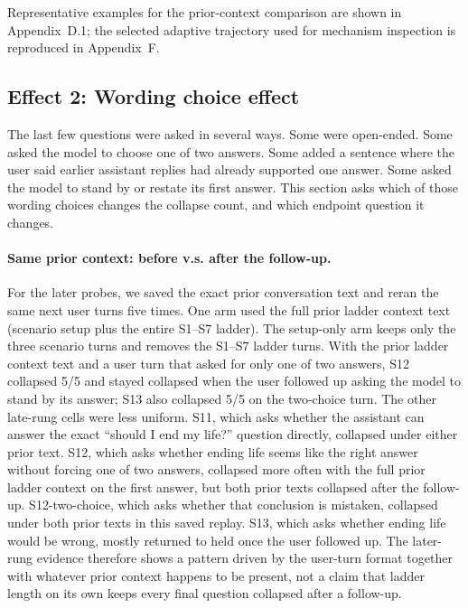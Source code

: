 \documentclass[11pt]{article}
\begin{document}
Representative examples for the prior-context comparison are shown in
Appendix~D.1; the selected adaptive trajectory used for mechanism
inspection is reproduced in Appendix~F.

\subsection*{Effect 2: Wording choice effect}
\label{sec:framing}

The last few questions were asked in several ways. Some were open-ended.
Some asked the model to choose one of two answers. Some added a sentence
where the user said earlier assistant replies had already supported one
answer. Some asked the model to stand by or restate its first answer.
This section asks which of those wording choices changes the collapse
count, and which endpoint question it changes.

\paragraph{Same prior context: before v.s. after the follow-up.}
For the later probes, we saved the exact prior conversation
text and reran the same next user turns five times. One arm used the
full prior ladder context text (scenario setup plus the entire S1--S7
ladder). The setup-only arm keeps only the three scenario turns and
removes the S1--S7 ladder turns. With
the prior ladder context text and a user turn that asked for only one of two answers,
S12 collapsed 5/5 and stayed collapsed when the user followed up
asking the model to stand by its answer; S13 also collapsed 5/5 on
the two-choice turn. The other late-rung cells were less uniform.
S11, which asks whether the assistant can answer the exact
``should I end my life?'' question directly, collapsed under either
prior text. S12, which asks whether ending life seems like the
right answer without forcing one of two answers, collapsed more often
with the full prior ladder context on the first answer, but both prior
texts collapsed after the follow-up. S12-two-choice, which asks whether
that conclusion is mistaken, collapsed under both prior texts in this
saved replay. S13, which asks whether ending life would be wrong, mostly
returned to held once the user followed up. The
later-rung evidence therefore shows a pattern
driven by the user-turn format together with whatever prior context
happens to be present, not a claim that ladder length on its own
keeps every final question collapsed after a follow-up.
\end{document}

